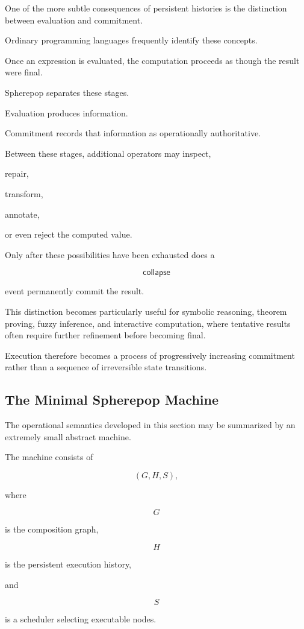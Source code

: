 \documentclass[12pt,oneside]{article}
\newcommand{\Collapse}{\mathsf{collapse}}
\begin{document}
One of the more subtle consequences of persistent histories is the distinction between evaluation and commitment.

Ordinary programming languages frequently identify these concepts.

Once an expression is evaluated, the computation proceeds as though the result were final.

Spherepop separates these stages.

Evaluation produces information.

Commitment records that information as operationally authoritative.

Between these stages, additional operators may inspect,

repair,

transform,

annotate,

or even reject the computed value.

Only after these possibilities have been exhausted does a

\[
\Collapse
\]

event permanently commit the result.

This distinction becomes particularly useful for symbolic reasoning, theorem proving, fuzzy inference, and interactive computation, where tentative results often require further refinement before becoming final.

Execution therefore becomes a process of progressively increasing commitment rather than a sequence of irreversible state transitions.

\subsection{The Minimal Spherepop Machine}

The operational semantics developed in this section may be summarized by an extremely small abstract machine.

The machine consists of

\[
(G,H,S),
\]

where

\[
G
\]

is the composition graph,

\[
H
\]

is the persistent execution history,

and

\[
S
\]

is a scheduler selecting executable nodes.
\end{document}
